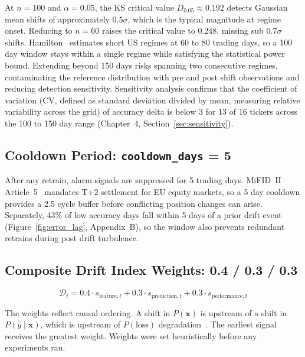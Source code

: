 At $n{=}100$ and $\alpha{=}0.05$, the KS critical value $D_{0.05} \approx 0.192$ detects Gaussian mean shifts of approximately $0.5\sigma$, which is the typical magnitude at regime onset. Reducing to $n{=}60$ raises the critical value to $0.248$, missing sub $0.7\sigma$ shifts. Hamilton~\cite{hamilton1989} estimates short US regimes at 60 to 80 trading days, so a 100 day window stays within a single regime while satisfying the statistical power bound. Extending beyond 150 days risks spanning two consecutive regimes, contaminating the reference distribution with pre and post shift observations and reducing detection sensitivity. Sensitivity analysis confirms that the coefficient of variation (CV, defined as standard deviation divided by mean, measuring relative variability across the grid) of accuracy delta is below 3 for 13 of 16 tickers across the 100 to 150 day range (Chapter~4, Section~\ref{sec:sensitivity}).

\subsection{Cooldown Period: \texttt{cooldown\_days} = 5}
\label{subsec:param_cooldown}

After any retrain, alarm signals are suppressed for 5 trading days. MiFID~II Article~5~\cite{mifid2014} mandates T+2 settlement for EU equity markets, so a 5 day cooldown provides a 2.5 cycle buffer before conflicting position changes can arise. Separately, 43\% of low accuracy days fall within 5 days of a prior drift event (Figure~\ref{fig:error_lag}, Appendix~B), so the window also prevents redundant retrains during post drift turbulence.

\subsection{Composite Drift Index Weights: 0.4 / 0.3 / 0.3}
\label{subsec:param_weights}

\begin{equation}
  \mathcal{D}_t = 0.4 \cdot s_{\text{feature},t}
                + 0.3 \cdot s_{\text{prediction},t}
                + 0.3 \cdot s_{\text{performance},t}
  \label{eq:composite_ch2}
\end{equation}

The weights reflect causal ordering. A shift in $P(\mathbf{x})$ is upstream of a shift in $P(\hat{y} \mid \mathbf{x})$, which is upstream of $P(\text{loss})$ degradation~\cite{gama2014survey}. The earliest signal receives the greatest weight. Weights were set heuristically before any experiments ran.

